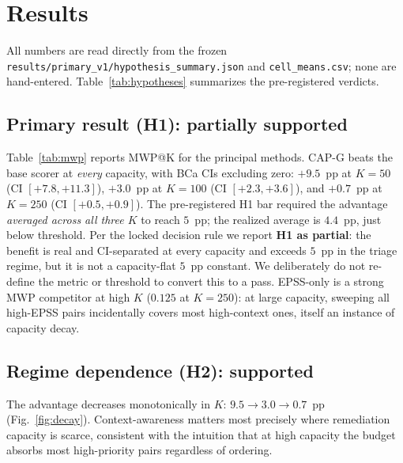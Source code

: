 \section{Results}
\label{sec:results}

All numbers are read directly from the frozen
\texttt{results/primary\_v1/hyp\-othesis\_summary.json} and \texttt{cell\_means.csv};
none are hand-entered. Table~\ref{tab:hypotheses} summarizes the pre-registered verdicts.



\subsection{Primary result (H1): partially supported}

Table~\ref{tab:mwp} reports MWP@K for the principal methods. CAP-G beats the base scorer
at \emph{every} capacity, with BCa CIs excluding zero: $+9.5$~pp at $K{=}50$
(CI $[+7.8,+11.3]$), $+3.0$~pp at $K{=}100$ (CI $[+2.3,+3.6]$), and $+0.7$~pp at $K{=}250$
(CI $[+0.5,+0.9]$). The pre-registered H1 bar required the advantage \emph{averaged across
all three $K$} to reach $5$~pp; the realized average is $4.4$~pp, just below threshold. Per
the locked decision rule we report \textbf{H1 as partial}: the benefit is real and
CI-separated at every capacity and exceeds $5$~pp in the triage regime, but it is not a
capacity-flat $5$~pp constant. We deliberately do not re-define the metric or threshold to
convert this to a pass. EPSS-only is a strong MWP competitor at high $K$ ($0.125$ at
$K{=}250$): at large capacity, sweeping all high-EPSS pairs incidentally covers most
high-context ones, itself an instance of capacity decay.



\subsection{Regime dependence (H2): supported}

The advantage decreases monotonically in $K$: $9.5\!\rightarrow\!3.0\!\rightarrow\!0.7$~pp
(Fig.~\ref{fig:decay}). Context-awareness matters most precisely where remediation
capacity is scarce, consistent with the intuition that at high capacity the budget absorbs
most high-priority pairs regardless of ordering.

